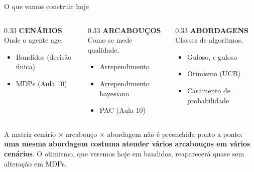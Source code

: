\documentclass[aspectratio=169, 10pt]{beamer}
\begin{document}
\begin{frame}{O que vamos construir hoje}
  \begin{columns}[T]
    \begin{column}{0.33\textwidth}
      {\color{rlTeal}\bfseries CENÁRIOS}\\[0.3em]
      {\small Onde o agente age.}
      \begin{itemize}\small
        \item Bandidos (decisão única)
        \item MDPs (Aula 10)
      \end{itemize}
    \end{column}
    \begin{column}{0.33\textwidth}
      {\color{rlAzulClaro}\bfseries ARCABOUÇOS}\\[0.3em]
      {\small Como se mede qualidade.}
      \begin{itemize}\small
        \item Arrependimento
        \item Arrependimento bayesiano
        \item PAC (Aula 10)
      \end{itemize}
    \end{column}
    \begin{column}{0.33\textwidth}
      {\color{rlLaranja}\bfseries ABORDAGENS}\\[0.3em]
      {\small Classes de algoritmos.}
      \begin{itemize}\small
        \item Guloso, $\epsilon$-guloso
        \item Otimismo (UCB)
        \item Casamento de probabilidade
      \end{itemize}
    \end{column}
  \end{columns}

  \bigskip
  \begin{ideiabox}
    A matriz cenário $\times$ arcabouço $\times$ abordagem não é preenchida
    ponto a ponto: \textbf{uma mesma abordagem costuma atender vários
    arcabouços em vários cenários}. O otimismo, que veremos hoje em
    bandidos, reaparecerá quase sem alteração em MDPs.
  \end{ideiabox}
\end{frame}

\end{document}
